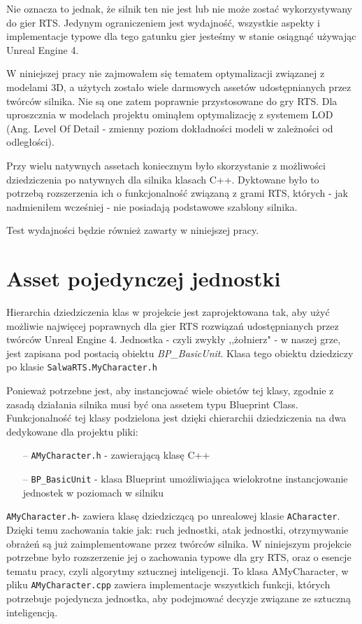 \documentclass[12pt]{report}
\begin{document}
Nie oznacza to jednak, że silnik ten nie jest lub nie może zostać wykorzystywany do gier RTS. Jedynym ograniczeniem jest wydajność, wszystkie aspekty i implementacje typowe dla tego gatunku gier jesteśmy w stanie osiągnąć używając Unreal Engine 4. 

W niniejszej pracy nie zajmowałem się tematem optymalizacji związanej z modelami 3D, a użytych zostało wiele darmowych assetów udostępnianych przez twórców silnika. Nie są one zatem poprawnie przystosowane do gry RTS. Dla uproszcznia w modelach projektu ominąłem optymalizację z systemem LOD (Ang. Level Of Detail - zmienny poziom dokładności modeli w zależności od odległości). 

Przy wielu natywnych assetach koniecznym było skorzystanie z możliwości dziedziczenia po natywnych dla silnika klasach C++. Dyktowane było to potrzebą rozszerzenia ich o funkcjonalność związaną z grami RTS, których - jak nadmieniłem wcześniej - nie posiadają podstawowe szablony silnika.


Test wydajności będzie również zawarty w niniejszej pracy.

\section{Asset pojedynczej jednostki}

Hierarchia dziedziczenia klas w projekcie jest zaprojektowana tak, aby użyć możliwie najwięcej poprawnych dla gier RTS rozwiązań udostępnianych przez twórców Unreal Engine 4. Jednostka - czyli zwykły ,,żołnierz" - w naszej grze, jest zapisana pod postacią obiektu \textit{BP\_BasicUnit}. Klasa tego obiektu dziedziczy po klasie \texttt{SalwaRTS.MyCharacter.h}

Ponieważ potrzebne jest, aby instancjować wiele obietów tej klasy, zgodnie z zasadą działania silnika musi być ona assetem typu Blueprint Class. Funkcjonalność tej klasy podzielona jest dzięki chierarchii dziedziczenia na dwa dedykowane dla projektu pliki: 
\begin{itemize}
\item[--] \texttt{AMyCharacter.h} - zawierającą klasę C++
\item[--] \texttt{\texttt{BP\_BasicUnit}} - klasa Blueprint umożliwiająca wielokrotne instancjowanie jednostek w poziomach w silniku
\end{itemize}

\texttt{AMyCharacter.h}- zawiera klasę dziedziczącą po unrealowej klasie \texttt{ACharacter}. Dzięki temu zachowania takie jak: ruch jednostki, atak jednostki, otrzymywanie obrażeń są już zaimplementowane przez twórców silnika. W niniejszym projekcie potrzebne było rozszerzenie jej o zachowania typowe dla gry RTS, oraz o esencje tematu pracy, czyli algorytmy sztucznej inteligencji. To klasa AMyCharacter, w pliku \texttt{AMyCharacter.cpp} zawiera implementacje wszystkich funkcji, których potrzebuje pojedyncza jednostka, aby podejmować decyzje związane ze sztuczną inteligencją.
\end{document}
